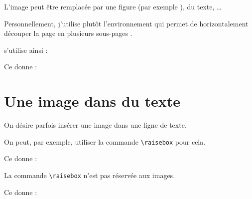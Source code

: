 \begin{info}
L'image peut être remplacée par une figure (par exemple ), du texte, \dots
\end{info}

Personnellement, j'utilise plutôt l'environnement  qui permet de horizontalement découper la page en plusieurs \og sous-pages \fg{}.

 s'utilise ainsi :


Ce  donne :

\bigskip



\section{Une image dans du texte}

On désire parfois insérer une image dans une ligne de texte.

On  peut, par exemple, utiliser la commande \verb!\raisebox! pour cela.


Ce  donne :



\begin{info}
La commande \texttt{\textbackslash raisebox} n'est pas réservée aux images.
\end{info}


Ce  donne : \hspace*{10em}




